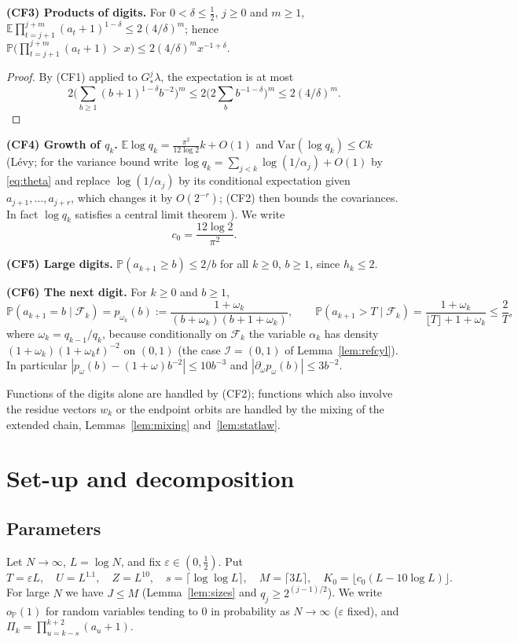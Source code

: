 \documentclass[11pt]{amsart}
\theoremstyle{definition}
\numberwithin{equation}{section}
\newcommand{\E}{\mathbb{E}}
\newcommand{\Prob}{\mathbb{P}}
\newcommand{\cF}{\mathcal{F}}
\newcommand{\cI}{\mathcal{I}}
\newcommand{\eps}{\varepsilon}
\begin{document}
\smallskip\noindent\textbf{(CF3) Products of digits.} For $0<\delta\le\frac12$, $j\ge0$ and $m\ge1$,
$\E\prod_{t=j+1}^{j+m}(a_t+1)^{1-\delta}\le2(4/\delta)^m$; hence $\Prob\big(\prod_{t=j+1}^{j+m}(a_t+1)>x\big)\le2(4/\delta)^mx^{-1+\delta}$.

\begin{proof}
By (CF1) applied to $G^j_*\lambda$, the expectation is at most
\[2\Big(\sum_{b\ge1}(b+1)^{1-\delta}b^{-2}\Big)^m\le2\Big(2\sum_bb^{-1-\delta}\Big)^m\le2(4/\delta)^m.\]
\end{proof}

\smallskip\noindent\textbf{(CF4) Growth of $q_k$.} $\E\log q_k=\frac{\pi^2}{12\log2}k+O(1)$ and $\mathrm{Var}(\log q_k)\le C k$ (L\'evy; for the
variance bound write $\log q_k=\sum_{j<k}\log(1/\alpha_j)+O(1)$ by \eqref{eq:theta} and replace $\log(1/\alpha_j)$ by its conditional
expectation given $a_{j+1},\dots,a_{j+r}$, which changes it by $O(2^{-r})$; (CF2) then bounds the covariances. In fact $\log q_k$ satisfies a
central limit theorem \cite{IK02}). We write
\[
c_0=\frac{12\log2}{\pi^2}.
\]

\smallskip\noindent\textbf{(CF5) Large digits.} $\Prob(a_{k+1}\ge b)\le 2/b$ for all $k\ge0$, $b\ge1$, since $h_k\le2$.

\smallskip\noindent\textbf{(CF6) The next digit.} For $k\ge0$ and $b\ge1$,
\[
\Prob(a_{k+1}=b\mid\cF_k)=p_{\omega_k}(b):=\frac{1+\omega_k}{(b+\omega_k)(b+1+\omega_k)},\qquad \Prob(a_{k+1}>T\mid\cF_k)=\frac{1+\omega_k}{\lfloor T\rfloor+1+\omega_k}\le\frac2T ,
\]
where $\omega_k=q_{k-1}/q_k$, because conditionally on $\cF_k$ the variable $\alpha_k$ has density $(1+\omega_k)(1+\omega_kt)^{-2}$ on $(0,1)$ (the case
$\cI=(0,1)$ of Lemma~\ref{lem:refcyl}). In particular $|p_\omega(b)-(1+\omega)b^{-2}|\le10b^{-3}$ and $|\partial_\omega p_\omega(b)|\le 3b^{-2}$.

\smallskip
Functions of the digits alone are handled by (CF2); functions which also involve the residue vectors $w_k$ or the endpoint orbits are handled by
the mixing of the extended chain, Lemmas~\ref{lem:mixing} and~\ref{lem:statlaw}.
\section{Set-up and decomposition}\label{sec:decomp}

\subsection{Parameters}
Let $N\to\infty$, $L=\log N$, and fix $\eps\in(0,\frac12)$. Put
\[
T=\eps L,\quad U=L^{1.1},\quad Z=L^{10},\quad s=\lceil\log\log L\rceil,\quad M=\lceil 3L\rceil,\quad K_0=\lfloor c_0(L-10\log L)\rfloor .
\]
For large $N$ we have $J\le M$ (Lemma~\ref{lem:sizes} and $q_j\ge 2^{(j-1)/2}$). We write $o_\Prob(1)$ for random variables tending to
$0$ in probability as $N\to\infty$ ($\eps$ fixed), and $\Pi_k=\prod_{u=k-s}^{k+2}(a_u+1)$.
\end{document}
